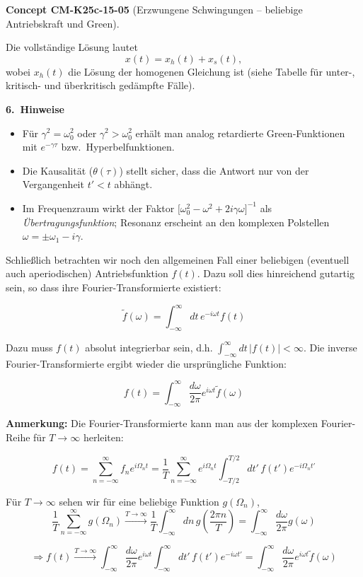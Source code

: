 \documentclass[10pt, letterpaper]{article}
\newcommand{\CustomHeading}[3]{%
  \par\medskip\noindent%
  \textbf{#1 #2} \textnormal{(#3)}.\enskip%
}
\newenvironment{CONC}[2]{\begin{unitbox}\CustomHeading{Concept}{#1}{#2}}{\end{unitbox}}
\begin{document}
\begin{CONC}{CM-K25c-15-05}{Erzwungene Schwingungen – beliebige Antriebskraft und Green}
Die vollständige Lösung lautet
\[
  x(t)=x_h(t)+x_s(t),
\]
wobei \(x_h(t)\) die Lösung der homogenen Gleichung ist  
(siehe Tabelle für unter-, kritisch- und überkritisch gedämpfte Fälle).

\textbf{6.\ Hinweise}

\begin{itemize}
  \item Für \(\gamma^{2}=\omega_{0}^{2}\) oder \(\gamma^{2}>\omega_{0}^{2}\) 
        erhält man analog retardierte Green‐Funktionen mit
        \(e^{-\gamma\tau}\) bzw.\ Hyperbelfunktionen.
  \item Die Kausalität (\(\theta(\tau)\)) stellt sicher, dass die Antwort
        nur von der Vergangenheit \(t'<t\) abhängt.
  \item Im Frequenzraum wirkt der Faktor
        \(\bigl[\omega_{0}^{2}-\omega^{2}+2i\gamma\omega\bigr]^{-1}\)
        als \emph{Übertragungsfunktion}; Resonanz erscheint an den
        komplexen Polstellen \(\omega=\pm\omega_{1}-i\gamma\).
\end{itemize}
\end{CONC}




Schließlich betrachten wir noch den allgemeinen Fall einer beliebigen (eventuell auch aperiodischen) Antriebsfunktion $f(t)$. Dazu soll dies hinreichend gutartig sein, so dass ihre Fourier-Transformierte existiert:

\[\tilde{f}(\omega)=\int_{-\infty}^{\infty} dt\,e^{-i\omega t}f(t)\]

Dazu muss $f(t)$ absolut integrierbar sein, d.h. $\int_{-\infty}^{\infty}dt\,|f(t)| < \infty$.
Die inverse Fourier-Transformierte ergibt wieder die ursprüngliche Funktion:

\[f(t)=\int_{-\infty}^{\infty}\frac{d\omega}{2\pi}e^{i\omega t}\tilde{f}(\omega)\]

\textbf{Anmerkung:} Die Fourier-Transformierte kann man aus der komplexen Fourier-Reihe für $T\to\infty$ herleiten:

\[f(t)=\sum_{n=-\infty}^{\infty}f_n e^{i\Omega_n t}=\frac{1}{T}\sum_{n=-\infty}^{\infty}e^{i\Omega_n t}\int_{-T/2}^{T/2}dt'\,f(t')e^{-i\Omega_n t'}\]

Für $T\to\infty$ sehen wir für eine beliebige Funktion $g(\Omega_n)$,
\[\frac{1}{T}\sum_{n=-\infty}^{\infty}g(\Omega_n)\xrightarrow{T\to\infty}\frac{1}{T}\int_{-\infty}^{\infty}dn\,g(\frac{2\pi n}{T})=\int_{-\infty}^{\infty}\frac{d\omega}{2\pi}g(\omega)\]

\[\Rightarrow f(t)\xrightarrow{T\to\infty}\int_{-\infty}^{\infty}\frac{d\omega}{2\pi}e^{i\omega t}\int_{-\infty}^{\infty}dt'\,f(t')e^{-i\omega t'}=\int_{-\infty}^{\infty}\frac{d\omega}{2\pi}e^{i\omega t}\tilde{f}(\omega)\]
\end{document}
